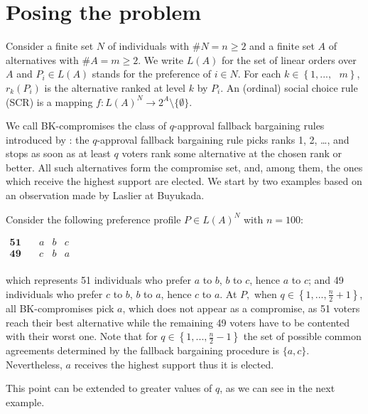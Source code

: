 \documentclass[version=3.21, pagesize, notitlepage, twoside=off, bibliography=totoc, DIV=calc, fontsize=12pt, a4paper]{scrartcl}
\begin{document}
\section{Posing the problem}
Consider a finite set $N$ of individuals with $\#N=n\geq 2$ and a finite set $A$ of alternatives with $\#A=m\geq 2$. We write $L(A)$ for the set of linear orders over $A$ and $P_{i}\in L(A)$ stands for the preference of $i\in N$. For each $k\in \left\{ 1,...,\text{ }m\right\} $, $r_{k}(P_{i})$ is the alternative ranked at level $k$ by $P_{i}$. An (ordinal) social choice rule (SCR) is a mapping $f:L(A)^{N}\rightarrow 2^{A} \setminus \{\emptyset \}$.

We call BK-compromises the class of $q$-approval fallback bargaining rules introduced by \citet{Brams2001}: the $q$-approval fallback bargaining rule picks ranks 1, 2, …, and stops as soon as at least $q$ voters rank some alternative at the chosen rank or better. All such alternatives form the compromise set, and, among them, the ones which receive the highest support are elected.
We start by two examples based on an observation made by Laslier at Buyukada. 
\begin{example}
	Consider the following preference profile $P\in L(A)^{N}$ with $n=100$:
	\begin{center}
		$
		\begin{array}{cccc}
		\mathbf{51} \quad &a&b&c\\
		\mathbf{49} \quad &c&b&a\\
		\end{array}
		$
	\end{center}
	which represents 51 individuals who prefer $a$ to $b$, $b$ to $c$, hence $a$ to $c$; and 49 individuals who prefer $c$ to $b$, $b$ to $a$, hence $c$ to $a $. At $P,$ when $q\in \left\{ 1,..., \frac{n}{2} +1\right\} $, all BK-compromises pick $a$, which does not appear as a compromise, as 51 voters reach their best alternative while the remaining 49 voters have to be contented with their worst one. Note that for $q\in \left\{ 1,..., \frac{n}{2} -1 \right\} $ the set of possible common agreements determined by the fallback bargaining procedure is $\{a,c\}$. Nevertheless, $a$ receives the highest support thus it is elected.
\end{example}

This point can be extended to greater values of $q$, as we can see in the next example.
\end{document}

